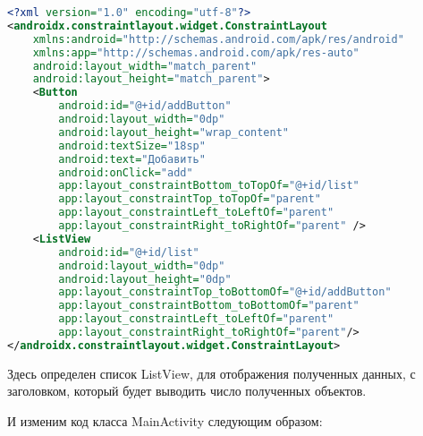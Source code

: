 \begin{lstlisting}[language=XML
	, label=lst:
	]
<?xml version="1.0" encoding="utf-8"?>
<androidx.constraintlayout.widget.ConstraintLayout
    xmlns:android="http://schemas.android.com/apk/res/android"
    xmlns:app="http://schemas.android.com/apk/res-auto"
    android:layout_width="match_parent"
    android:layout_height="match_parent">
    <Button
        android:id="@+id/addButton"
        android:layout_width="0dp"
        android:layout_height="wrap_content"
        android:textSize="18sp"
        android:text="Добавить"
        android:onClick="add"
        app:layout_constraintBottom_toTopOf="@+id/list"
        app:layout_constraintTop_toTopOf="parent"
        app:layout_constraintLeft_toLeftOf="parent"
        app:layout_constraintRight_toRightOf="parent" />
    <ListView
        android:id="@+id/list"
        android:layout_width="0dp"
        android:layout_height="0dp"
        app:layout_constraintTop_toBottomOf="@+id/addButton"
        app:layout_constraintBottom_toBottomOf="parent"
        app:layout_constraintLeft_toLeftOf="parent"
        app:layout_constraintRight_toRightOf="parent"/>
</androidx.constraintlayout.widget.ConstraintLayout>
\end{lstlisting}

Здесь определен список ListView, для отображения полученных данных, с
заголовком, который будет выводить число полученных объектов.\par
И изменим код класса MainActivity следующим образом:

